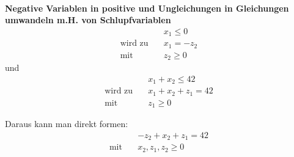 \documentclass{article}
\begin{document}
\bigskip
\begin{minipage}{0.2cm}
$\ $
\end{minipage}
\begin{minipage}{9.8cm}
\textbf{Negative Variablen in positive und Ungleichungen in Gleichungen umwandeln m.H. von Schlupfvariablen}
\begin{align*}
    &  x_1 \leq 0 \\
    \text{wird zu} \quad  & x_1 = -z_2  \\
    \text{mit} \quad  & z_2 \geq 0  
\end{align*}
und 
\begin{align*}
    & x_1 + x_2 \leq 42 \\
    \text{wird zu} \quad  & x_1 + x_2 + z_1 = 42 \\
    \text{mit} \quad & z_1 \geq 0 
\end{align*}
\end{minipage}

Daraus kann man direkt formen: 
\begin{align*}
    & -z_2 + x_2 + z_1 = 42 \\
    \text{mit} \quad & x_2, z_1, z_2 \geq 0 \\
\end{align*}
\end{document}
